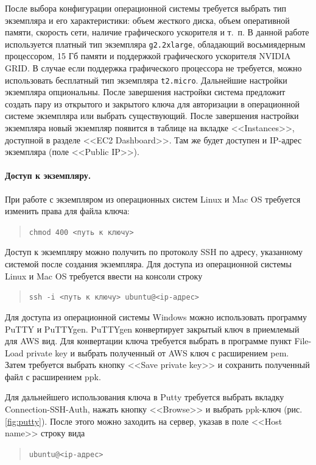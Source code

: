 \documentclass[12pt,notitlepage]{article}
\begin{document}
После выбора конфигурации операционной системы требуется выбрать тип экземпляра и его характеристики: объем жесткого диска, объем оперативной памяти, скорость сети, наличие графического ускорителя и т.~п. В данной работе используется платный тип экземпляра \texttt{g2.2xlarge}, обладающий восьмиядерным процессором, 15 Гб памяти и поддержкой графического ускорителя NVIDIA GRID. В случае если поддержка графического процессора не требуется, можно использовать бесплатный тип экземпляра \texttt{t2.micro}. Дальнейшие настройки экземпляра опциональны. После завершения настройки система предложит создать пару из открытого и закрытого ключа для авторизации в операционной системе экземпляра или выбрать существующий. После завершения настройки экземпляра новый экземпляр появится в таблице на вкладке <<Instances>>, доступной в разделе <<EC2 Dashboard>>. Там же будет доступен и IP-адрес экземпляра (поле <<Public IP>>).


\paragraph{Доступ к экземпляру.}
При работе с экземпляром из операционных систем Linux и Mac OS требуется изменить права для файла ключа:
\begin{quote}
\tt{chmod 400 <путь к ключу>}
\end{quote}

Доступ к экземпляру можно получить по протоколу SSH по адресу, указанному системой после создания экземпляра. 
Для доступа из операционной системы Linux и Mac OS требуется ввести на консоли строку
\begin{quote}
\tt{ssh -i <путь к ключу> ubuntu@<ip-адрес>}
\end{quote}

Для доступа из операционной системы Windows можно использовать программу PuTTY и PuTTYgen. PuTTYgen конвертирует закрытый ключ в приемлемый для AWS вид.
Для конвертации ключа требуется выбрать в программе пункт 
File-Load private key и выбрать полученный от AWS ключ с расширением pem. Затем требуется выбрать кнопку <<Save private key>> и сохранить полученный файл с расширением ppk.

Для дальнейшего использования ключа в Putty требуется выбрать вкладку Connection-SSH-Auth, нажать кнопку <<Browse>> и выбрать ppk-ключ (рис.\ref{fig:putty}). После этого можно заходить на сервер, указав в поле <<Host name>> строку вида
\begin{quote}
\tt{ubuntu@<ip-адрес>}
\end{quote}
\end{document}
